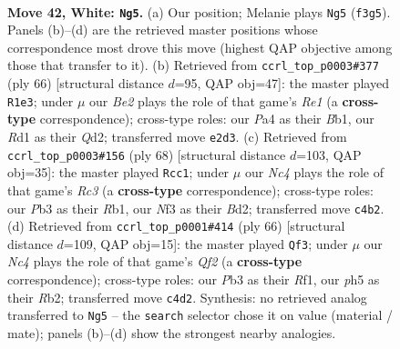 \documentclass[11pt]{article}
\begin{document}
\clearpage

\begin{figure}[p]\centering
\begin{subfigure}{0.46\textwidth}\centering
\resizebox{\linewidth}{!}{%
\newchessgame
\chessboard[
  setfen={rnb2q2/1p4k1/4p3/p1r2p1p/PnN2P2/1P2QNP1/4B1KP/3R3R w - - 3 42},
  showmover=false,
  pgfstyle=straightmove, color=movearrow, markmove={f3-g5}
]}
\caption{}
\end{subfigure}\hfill
\begin{subfigure}{0.46\textwidth}\centering
\resizebox{\linewidth}{!}{%
\newchessgame
\chessboard[
  setfen={6qk/1p1b1r1p/p1p1nr2/3pRNpP/1P1P2P1/P7/3Q1P2/1B2R1K1 w - g6 0 34},
  showmover=false,
  pgfstyle=straightmove, color=movearrow, markmove={e1-e3}
]}
\caption{}
\end{subfigure}
\\[4pt]
\begin{subfigure}{0.46\textwidth}\centering
\resizebox{\linewidth}{!}{%
\newchessgame
\chessboard[
  setfen={rr3b2/5ppk/1q1p3p/1npPp3/4P3/1PRQN2P/3B1PP1/1R4K1 w - - 4 35},
  showmover=false,
  pgfstyle=straightmove, color=movearrow, markmove={c3-c1}
]}
\caption{}
\end{subfigure}\hfill
\begin{subfigure}{0.46\textwidth}\centering
\resizebox{\linewidth}{!}{%
\newchessgame
\chessboard[
  setfen={1rnqr2k/1p4p1/p2p2bp/P2P1p2/1BNP3b/7P/1RPN1QP1/5RK1 w - - 13 34},
  showmover=false,
  pgfstyle=straightmove, color=movearrow, markmove={f2-f3}
]}
\caption{}
\end{subfigure}
\caption{\textbf{Move 42, White: \texttt{Ng5}.} (a) Our position; Melanie plays \texttt{Ng5} (\texttt{f3g5}). Panels (b)--(d) are the retrieved master positions whose correspondence most drove this move (highest QAP objective among those that transfer to it). (b) Retrieved from \texttt{ccrl\_top\_p0003\#377} (ply 66) [structural distance $d$=95, QAP obj=47]: the master played \texttt{R1e3}; under $\mu$ our \emph{Be2} plays the role of that game's \emph{Re1} (a \textbf{cross-type} correspondence); cross-type roles: our \emph{P}a4 as their \emph{B}b1, our \emph{R}d1 as their \emph{Q}d2; transferred move \texttt{e2d3}. (c) Retrieved from \texttt{ccrl\_top\_p0003\#156} (ply 68) [structural distance $d$=103, QAP obj=35]: the master played \texttt{Rcc1}; under $\mu$ our \emph{Nc4} plays the role of that game's \emph{Rc3} (a \textbf{cross-type} correspondence); cross-type roles: our \emph{P}b3 as their \emph{R}b1, our \emph{N}f3 as their \emph{B}d2; transferred move \texttt{c4b2}. (d) Retrieved from \texttt{ccrl\_top\_p0001\#414} (ply 66) [structural distance $d$=109, QAP obj=15]: the master played \texttt{Qf3}; under $\mu$ our \emph{Nc4} plays the role of that game's \emph{Qf2} (a \textbf{cross-type} correspondence); cross-type roles: our \emph{P}b3 as their \emph{R}f1, our \emph{p}h5 as their \emph{R}b2; transferred move \texttt{c4d2}. Synthesis: no retrieved analog transferred to \texttt{Ng5} -- the \texttt{search} selector chose it on value (material / mate); panels (b)--(d) show the strongest nearby analogies.}
\label{fig:thought-m82}
\end{figure}
\end{document}
